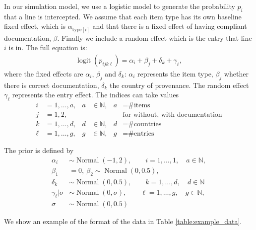 \documentclass{article}
\DeclareMathOperator{\logit}{logit}
\DeclareMathOperator{\Normal}{Normal}
\begin{document}
In our simulation model, we use a logistic model to generate the probability \(p_i\) that a line is intercepted. We assume that each item type has its own baseline fixed effect, which is \(\alpha_{\text{type}[i]}\) and that there is a fixed effect of having compliant documentation, \(\beta\). Finally we include a random effect which is the entry that line \(i\) is in. The full equation is:
\begin{align}
\logit(p_{ijk\ell}) = \alpha_{i} + \beta_j + \delta_k + \gamma_\ell \label{eq:logit_model_sim},
\end{align}
where the fixed effects are $\alpha_i$, $\beta_j$ and $\delta_k$: $\alpha_i$ represents the item type, $\beta_j$ whether there is correct documentation, $\delta_k$ the country of provenance. The random effect $\gamma_\ell$ represents the entry effect. The indices can take values
\begin{align}
i &=1, \ldots, a, & a&\in \mathbb{N},& a &= \text{\# items}\\
j &=1, 2, & & & &\text{for without, with documentation}\\
k &= 1,\ldots, d,& d &\in \mathbb{N},& d &= \text{\# countries}\\
\ell &= 1,\ldots,g,& g&\in \mathbb{N},& g &= \text{\# entries}
\end{align}


The prior is defined by
\begin{align}
\alpha_i &\sim \Normal(-1, 2), \qquad i=1, \ldots, 1, \quad a\in \mathbb{N},\\
\beta_1 &= 0 , \ \beta_2 \sim \Normal(0, 0.5),\\
\delta_k &\sim \Normal(0, 0.5), \qquad k = 1,\ldots, d, \quad d \in \mathbb{N}\\
\gamma_\ell | \sigma &\sim \Normal(0, \sigma), \qquad \ell = 1,\ldots, g, \quad g\in \mathbb{N},\\
\sigma &\sim \Normal(0, 0.5)
\end{align}

We show an example of the format of the data in Table \ref{table:example_data}.
\end{document}
